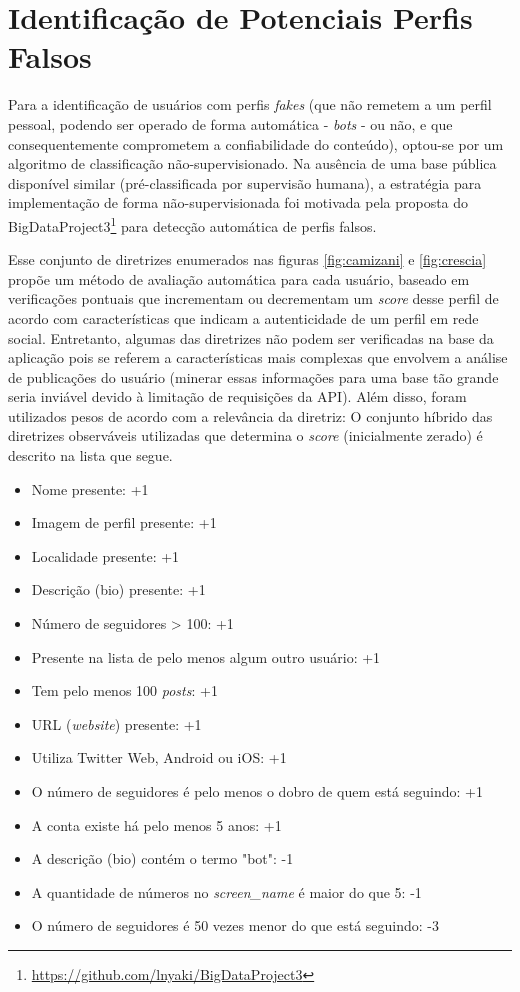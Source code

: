 \section{Identificação de Potenciais Perfis Falsos}
	Para a identificação de usuários com perfis \textit{fakes} (que não remetem a um perfil pessoal, podendo ser operado de forma automática - \textit{bots} - ou não, e que consequentemente comprometem a confiabilidade do conteúdo), optou-se por um algoritmo de classificação não-supervisionado. Na ausência de uma base pública disponível similar (pré-classificada por supervisão humana), a estratégia para implementação de forma não-supervisionada foi motivada pela proposta do BigDataProject3\footnote{\href{https://github.com/lnyaki/BigDataProject3}{https://github.com/lnyaki/BigDataProject3}} para detecção automática de perfis falsos.
	
	Esse conjunto de diretrizes enumerados nas figuras \ref{fig:camizani} e \ref{fig:crescia} propõe um método de avaliação automática para cada usuário, baseado em verificações pontuais que incrementam ou decrementam um \textit{score} desse perfil de acordo com características que indicam a autenticidade de um perfil em rede social. Entretanto, algumas das diretrizes não podem ser verificadas na base da aplicação pois se referem a características mais complexas que envolvem a análise de publicações do usuário (minerar essas informações para uma base tão grande seria inviável devido à limitação de requisições da API). Além disso, foram utilizados pesos de acordo com a relevância da diretriz: O conjunto híbrido das diretrizes observáveis utilizadas que determina o \textit{score} (inicialmente zerado) é descrito na lista que segue.


\begin{itemize}
	\item Nome presente: +1 
	\item Imagem de perfil presente: +1 
	\item Localidade presente: +1 
	\item Descrição (bio) presente: +1 
	\item Número de seguidores > 100: +1 
	\item Presente na lista de pelo menos algum outro usuário: +1 
	\item Tem pelo menos 100 \textit{posts}: +1 
	\item URL (\textit{website}) presente: +1 
	\item Utiliza Twitter Web, Android ou iOS: +1 
	\item O número de seguidores é pelo menos o dobro de quem está seguindo: +1 
	\item A conta existe há pelo menos 5 anos: +1 
	\item A descrição (bio) contém o termo "bot": -1 
	\item A quantidade de números no \textit{screen\_name} é maior do que 5: -1 
	\item O número de seguidores é 50 vezes menor do que está seguindo: -3

\end{itemize}	

